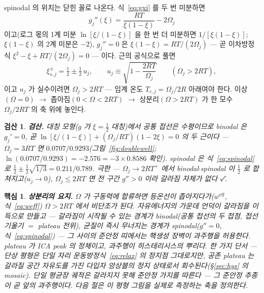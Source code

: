 \documentclass[11pt,a4paper]{article}
\newtheorem*{keybox}{핵심}
\newtheorem*{verifybox}{검산}
\newcommand{\eff}{\mathrm{eff}}
\begin{document}
spinodal 의 위치는 닫힌 꼴로 나온다. 식~\eqref{eq:gxi} 를 두 번 미분하면
\begin{equation}
g_j''(\xi)=\frac{RT}{\xi(1-\xi)}-2\Omega_j
\label{eq:gpp}
\end{equation}
이고(로그 몫의 1계 미분 $\ln[\xi/(1-\xi)]$ 을 한 번 더 미분하면 $1/[\xi(1-\xi)]$;
$\xi(1-\xi)$ 의 2계 미분은 $-2$), $g_j''=0$ 은 $\xi(1-\xi)=RT/(2\Omega_j)$ — 곧 이차방정식
$\xi^2-\xi+RT/(2\Omega_j)=0$ — 이다. 근의 공식으로 풀면
\begin{equation}
\xi_{s,j}^\pm=\tfrac12\pm\tfrac12\,u_j,\qquad u_j\equiv\sqrt{1-\frac{2RT}{\Omega_j}}
\qquad(\Omega_j>2RT),
\label{eq:spinodal}
\end{equation}
이고 $u_j$ 가 실수이려면 $\Omega_j>2RT$ — 임계 온도 $T_{c,j}=\Omega_j/2R$ 아래여야 한다. 이상$(\Omega=0)$
$\to$ 좁아짐$(0<\Omega<2RT)$ $\to$ 상분리$(\Omega>2RT)$ 가 한 모수 $\Omega_j/2RT$ 의 축 위에 놓인다.

\begin{verifybox}
\textbf{검산.} 대칭 모형($g$ 가 $\xi=\tfrac12$ 대칭)에서 공통 접선은 수평이므로 binodal 은 $g_j'=0$,
곧 $\ln[\xi/(1-\xi)]+(\Omega_j/RT)(1-2\xi)=0$ 의 두 근이다 — $\Omega_j=3RT$ 면
$0.0707/0.9293$(그림~\ref{fig:doublewell}; $\ln(0.0707/0.9293)=-2.576=-3\times0.8586$ 확인).
spinodal 은 식~\eqref{eq:spinodal} 로 $\tfrac12\pm\tfrac12\sqrt{1/3}=0.211/0.789$. 극한 —
$\Omega_j\to2RT^+$ 에서 binodal$\cdot$spinodal 이 $\tfrac12$ 로 합쳐지고($u_j\to0$),
$\Omega_j\le2RT$ 면 전 구간 $g''>0$ 이라 갈라짐 자체가 없다 ✓.
\end{verifybox}

\begin{keybox}
\textbf{상분리의 요지.} $\Omega$ 가 구동력에 합류하면 등온선이 좁아지다가($w^{\eff}$,
식~\eqref{eq:weff}) $\Omega>2RT$ 에서 비단조가 된다. 자유에너지의 가운데 언덕이 갈라짐을 이득으로 만들고
— 갈라짐이 시작될 수 있는 경계가 binodal(공통 접선의 두 접점, 접선 기울기 $=$ plateau 전위), 균질이 즉시
무너지는 경계가 spinodal($g''=0$, 식~\eqref{eq:spinodal}) — 그 사이의 준안정 띠에서는 핵생성 장벽이
과주행을 허용한다. plateau 가 ICA peak 의 정체이고, 과주행이 히스테리시스의 뿌리다. 한 가지 단서 — 단상 평형은
단일 자리 운동방정식~\eqref{eq:relax} 의 정지점 그대로지만, 공존 plateau 는 갈라질 공간 자유도를 가진
\emph{다입자 앙상블}의 정지 상태로서 회수된다(\S\ref{sec:hys} 의 mosaic). 단일 평균장 궤적은
갈라지지 못해 준안정 가지를 따른다 — 그 준안정 추종이 곧 앞의 과주행이다. 다음 절은 이 평형 그림을 실제로
\emph{측정하는 축}을 정의한다.
\end{keybox}
\end{document}
